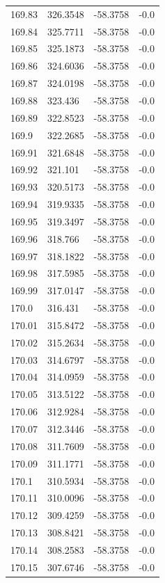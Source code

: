 \begin{table}[H]
\begin{tabular}{llll}
169.83 & 326.3548 & -58.3758 & -0.0 \\
169.84 & 325.7711 & -58.3758 & -0.0 \\
169.85 & 325.1873 & -58.3758 & -0.0 \\
169.86 & 324.6036 & -58.3758 & -0.0 \\
169.87 & 324.0198 & -58.3758 & -0.0 \\
169.88 & 323.436 & -58.3758 & -0.0 \\
169.89 & 322.8523 & -58.3758 & -0.0 \\
169.9 & 322.2685 & -58.3758 & -0.0 \\
169.91 & 321.6848 & -58.3758 & -0.0 \\
169.92 & 321.101 & -58.3758 & -0.0 \\
169.93 & 320.5173 & -58.3758 & -0.0 \\
169.94 & 319.9335 & -58.3758 & -0.0 \\
169.95 & 319.3497 & -58.3758 & -0.0 \\
169.96 & 318.766 & -58.3758 & -0.0 \\
169.97 & 318.1822 & -58.3758 & -0.0 \\
169.98 & 317.5985 & -58.3758 & -0.0 \\
169.99 & 317.0147 & -58.3758 & -0.0 \\
170.0 & 316.431 & -58.3758 & -0.0 \\
170.01 & 315.8472 & -58.3758 & -0.0 \\
170.02 & 315.2634 & -58.3758 & -0.0 \\
170.03 & 314.6797 & -58.3758 & -0.0 \\
170.04 & 314.0959 & -58.3758 & -0.0 \\
170.05 & 313.5122 & -58.3758 & -0.0 \\
170.06 & 312.9284 & -58.3758 & -0.0 \\
170.07 & 312.3446 & -58.3758 & -0.0 \\
170.08 & 311.7609 & -58.3758 & -0.0 \\
170.09 & 311.1771 & -58.3758 & -0.0 \\
170.1 & 310.5934 & -58.3758 & -0.0 \\
170.11 & 310.0096 & -58.3758 & -0.0 \\
170.12 & 309.4259 & -58.3758 & -0.0 \\
170.13 & 308.8421 & -58.3758 & -0.0 \\
170.14 & 308.2583 & -58.3758 & -0.0 \\
170.15 & 307.6746 & -58.3758 & -0.0 \\

\end{tabular}
\end{table}
